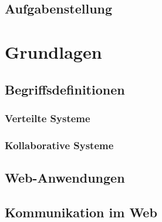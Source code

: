 \documentclass[toc=bib,toc=listof, 12pt]{scrreprt}
\begin{document}
	\section{Aufgabenstellung}
		
\newpage
\clearpage
\thispagestyle{empty}
	
\chapter{Grundlagen}
\setcounter{page}{6}
\label{sec:grundlagen}
	\section{Begriffsdefinitionen}
	\label{sec:begriffsdefinitionen}
		\subsection{Verteilte Systeme}
			
		\subsection{Kollaborative Systeme}
			
%				
	\section{Web-Anwendungen}
	\label{sec:web_anwendungen}
		
	\section{Kommunikation im Web}
	\label{sec:kommunikation_im_web}
		
%		
\newpage
\clearpage
\thispagestyle{empty}
				
\end{document}
